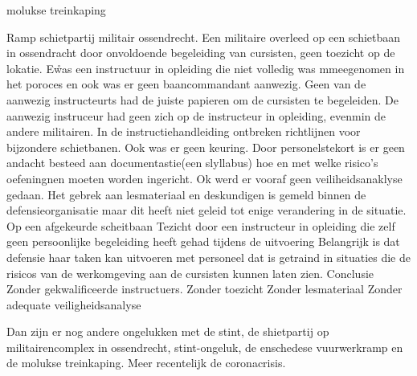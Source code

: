 
\newline \indent  molukse treinkaping 

\newline \indent Ramp schietpartij militair ossendrecht. Een militaire overleed op een schietbaan in ossendracht door onvoldoende begeleiding van cursisten, geen toezicht op de lokatie. E\r was een instructuur in opleiding die niet volledig was mmeegenomen in het poroces en ook was er geen baancommandant aanwezig. Geen van de aanwezig instructeurts had de juiste papieren om de cursisten te begeleiden. De aanwezig instruceur had geen zich op de instructeur in opleiding, evenmin de andere militairen. In de instructiehandleiding ontbreken richtlijnen voor bijzondere schietbanen. Ook was er geen keuring. Door personelstekort is er geen andacht besteed aan documentastie(een slyllabus) hoe en met welke risico’s oefeningnen moeten worden ingericht. Ok werd er vooraf geen veiliheidsanaklyse gedaan. Het gebrek aan lesmateriaal en deskundigen is gemeld binnen de defensieorganisatie maar dit heeft niet geleid tot enige verandering in de situatie.
Op een afgekeurde scheitbaan
Tezicht door een instructeur in opleiding die zelf geen persoonlijke begeleiding heeft gehad tijdens de uitvoering
Belangrijk is dat defensie haar taken kan uitvoeren met personeel dat is getraind in situaties die de risicos van de werkomgeving aan de cursisten kunnen laten zien.
Conclusie
Zonder gekwalificeerde instructuers.
Zonder toezicht
Zonder lesmateriaal
Zonder adequate veiligheidsanalyse
\cite{ovvVideoOssendrecht}
\cite{oVVSchietongevalOssendrecht}
\cite{nos22032016ossendrecht}
\cite{ovv04042016lessenongevalossendrecht}
\cite{quekelboere10052017doodossendrecht}

\newline \indent Dan zijn er nog andere ongelukken met de stint, de shietpartij op militairencomplex in ossendrecht, stint-ongeluk, de enschedese vuurwerkramp en de molukse treinkaping. Meer recentelijk de coronacrisis.


